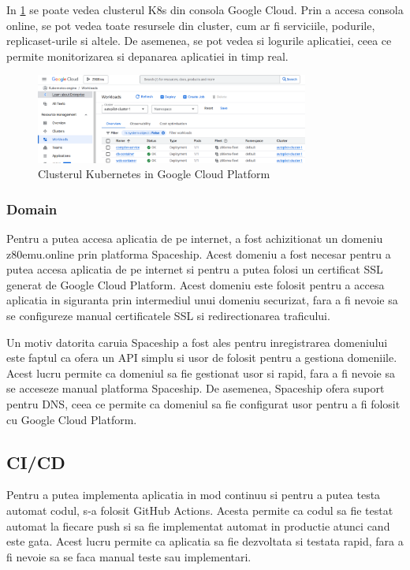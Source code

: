 \documentclass[titlepage,12pt]{article}
\DeclareRobustCommand{\code}[1]{{\ttfamily\small #1}}
\begin{document}
In \cref{fig:googlecluster} se poate vedea clusterul \ac {K8s} din consola Google Cloud. Prin a accesa consola online, se pot vedea toate resursele din cluster, cum ar fi serviciile, podurile, replicaset-urile si altele. De asemenea, se pot vedea si logurile aplicatiei, ceea ce permite monitorizarea si depanarea aplicatiei in timp real.
\begin{figure}[h]
    \centering
    \includegraphics[width=0.8\textwidth]{images/googlecluster.png}
    \caption{Clusterul Kubernetes in Google Cloud Platform}
    \label{fig:googlecluster}
\end{figure}

\subsubsection{Domain}
Pentru a putea accesa aplicatia de pe internet, a fost achizitionat un domeniu \code{z80emu.online} prin platforma Spaceship. Acest domeniu a fost necesar pentru a putea accesa aplicatia de pe internet si pentru a putea folosi un certificat \code{SSL} generat de Google Cloud Platform. Acest domeniu este folosit pentru a accesa aplicatia in siguranta prin intermediul unui domeniu securizat, fara a fi nevoie sa se configureze manual certificatele \code{SSL} si redirectionarea traficului.

Un motiv datorita caruia Spaceship a fost ales pentru inregistrarea domeniului este faptul ca ofera un API simplu si usor de folosit pentru a gestiona domeniile. Acest lucru permite ca domeniul sa fie gestionat usor si rapid, fara a fi nevoie sa se acceseze manual platforma Spaceship. De asemenea, Spaceship ofera suport pentru \ac {DNS}, ceea ce permite ca domeniul sa fie configurat usor pentru a fi folosit cu Google Cloud Platform.

\subsection{CI/CD}

Pentru a putea implementa aplicatia in mod continuu si pentru a putea testa automat codul, s-a folosit GitHub Actions. Acesta permite ca codul sa fie testat automat la fiecare push si sa fie implementat automat in productie atunci cand este gata. Acest lucru permite ca aplicatia sa fie dezvoltata si testata rapid, fara a fi nevoie sa se faca manual teste sau implementari.
\end{document}
